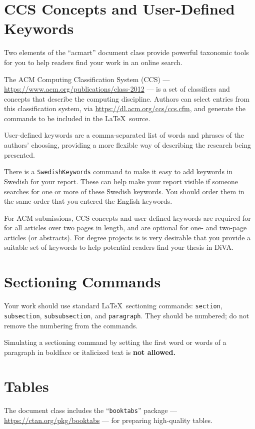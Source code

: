 \documentclass[manuscript, screen]{timtm}
\begin{document}
\section{CCS Concepts and User-Defined Keywords}

Two elements of the ``acmart'' document class provide powerful
taxonomic tools for you to help readers find your work in an online
search.

The ACM Computing Classification System  (CCS) ---
\url{https://www.acm.org/publications/class-2012} --- is a set of
classifiers and concepts that describe the computing
discipline. Authors can select entries from this classification
system, via \url{https://dl.acm.org/ccs/ccs.cfm}, and generate the
commands to be included in the \LaTeX\ source.

User-defined keywords are a comma-separated list of words and phrases
of the authors' choosing, providing a more flexible way of describing
the research being presented.

There is a \verb|SwedishKeywords| command to make it easy to add keywords in Swedish for your report. These can help make your report visible if someone searches for one or more of these Swedish keywords. You should order them in the same order that you entered the English keywords.

For ACM submissions, CCS concepts and user-defined keywords are required for for all
articles over two pages in length, and are optional for one- and
two-page articles (or abstracts). For degree projects is is very desirable that you provide a suitable set of keywords to help potential readers find your thesis in DiVA.

\section{Sectioning Commands}

Your work should use standard \LaTeX\ sectioning commands:
\verb|section|, \verb|subsection|, \verb|subsubsection|, and
\verb|paragraph|. They should be numbered; do not remove the numbering
from the commands.

Simulating a sectioning command by setting the first word or words of
a paragraph in boldface or italicized text is {\bfseries not allowed.}

\section{Tables}

The document class includes the ``\verb|booktabs|''
package --- \url{https://ctan.org/pkg/booktabs} --- for preparing
high-quality tables.
\end{document}
